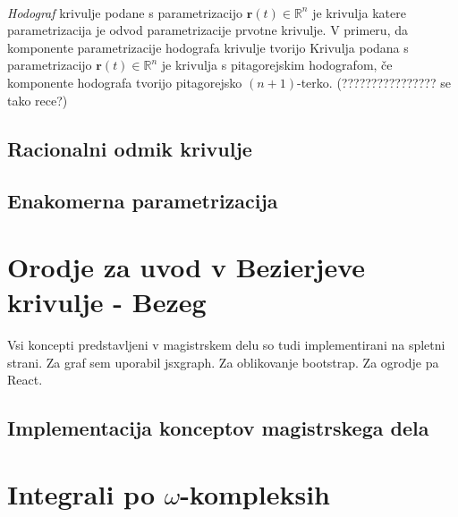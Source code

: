 \documentclass[isrm2, tisk]{fmfdelo}
\newcommand{\R}{\mathbb R}
\begin{document}
    \\

    \textit{Hodograf} krivulje podane s parametrizacijo $\mathbf{r}(t)\in \R^n$ je krivulja katere parametrizacija je odvod parametrizacije prvotne krivulje.
    V primeru, da komponente parametrizacije hodografa krivulje tvorijo
    Krivulja podana s parametrizacijo $\mathbf{r}(t)\in \R^n$ je krivulja s pitagorejskim hodografom, če komponente hodografa tvorijo pitagorejsko $(n+1)$-terko. (???????????????? se tako rece?)

    \subsection{Racionalni odmik krivulje}

    \subsection{Enakomerna parametrizacija}


    \section{Orodje za uvod v Bezierjeve krivulje - Bezeg}
    Vsi koncepti predstavljeni v magistrskem delu so tudi implementirani na spletni strani.
    Za graf sem uporabil jsxgraph. Za oblikovanje bootstrap. Za ogrodje pa React.

    \subsection{Implementacija konceptov magistrskega dela}






    \newpage



    \newpage
    \newpage
    \newpage


    \section{Integrali po \texorpdfstring{$\omega$}{ω}-kompleksih}
\end{document}
